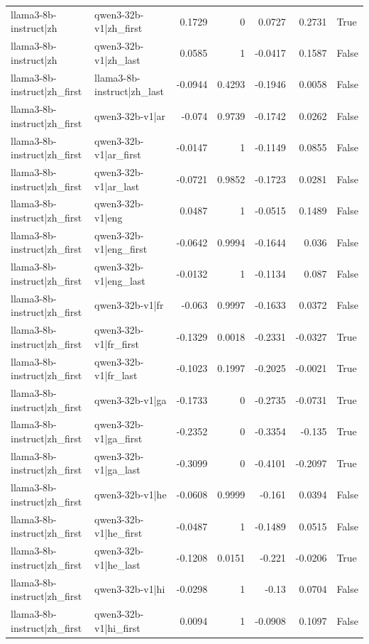 \begin{table}
\begin{tabular}{l l r r r r l}
llama3-8b-instruct|zh & qwen3-32b-v1|zh_first & 0.1729 & 0 & 0.0727 & 0.2731 & True \\
llama3-8b-instruct|zh & qwen3-32b-v1|zh_last & 0.0585 & 1 & -0.0417 & 0.1587 & False \\
llama3-8b-instruct|zh_first & llama3-8b-instruct|zh_last & -0.0944 & 0.4293 & -0.1946 & 0.0058 & False \\
llama3-8b-instruct|zh_first & qwen3-32b-v1|ar & -0.074 & 0.9739 & -0.1742 & 0.0262 & False \\
llama3-8b-instruct|zh_first & qwen3-32b-v1|ar_first & -0.0147 & 1 & -0.1149 & 0.0855 & False \\
llama3-8b-instruct|zh_first & qwen3-32b-v1|ar_last & -0.0721 & 0.9852 & -0.1723 & 0.0281 & False \\
llama3-8b-instruct|zh_first & qwen3-32b-v1|eng & 0.0487 & 1 & -0.0515 & 0.1489 & False \\
llama3-8b-instruct|zh_first & qwen3-32b-v1|eng_first & -0.0642 & 0.9994 & -0.1644 & 0.036 & False \\
llama3-8b-instruct|zh_first & qwen3-32b-v1|eng_last & -0.0132 & 1 & -0.1134 & 0.087 & False \\
llama3-8b-instruct|zh_first & qwen3-32b-v1|fr & -0.063 & 0.9997 & -0.1633 & 0.0372 & False \\
llama3-8b-instruct|zh_first & qwen3-32b-v1|fr_first & -0.1329 & 0.0018 & -0.2331 & -0.0327 & True \\
llama3-8b-instruct|zh_first & qwen3-32b-v1|fr_last & -0.1023 & 0.1997 & -0.2025 & -0.0021 & True \\
llama3-8b-instruct|zh_first & qwen3-32b-v1|ga & -0.1733 & 0 & -0.2735 & -0.0731 & True \\
llama3-8b-instruct|zh_first & qwen3-32b-v1|ga_first & -0.2352 & 0 & -0.3354 & -0.135 & True \\
llama3-8b-instruct|zh_first & qwen3-32b-v1|ga_last & -0.3099 & 0 & -0.4101 & -0.2097 & True \\
llama3-8b-instruct|zh_first & qwen3-32b-v1|he & -0.0608 & 0.9999 & -0.161 & 0.0394 & False \\
llama3-8b-instruct|zh_first & qwen3-32b-v1|he_first & -0.0487 & 1 & -0.1489 & 0.0515 & False \\
llama3-8b-instruct|zh_first & qwen3-32b-v1|he_last & -0.1208 & 0.0151 & -0.221 & -0.0206 & True \\
llama3-8b-instruct|zh_first & qwen3-32b-v1|hi & -0.0298 & 1 & -0.13 & 0.0704 & False \\
llama3-8b-instruct|zh_first & qwen3-32b-v1|hi_first & 0.0094 & 1 & -0.0908 & 0.1097 & False \\

\end{tabular}
\end{table}
